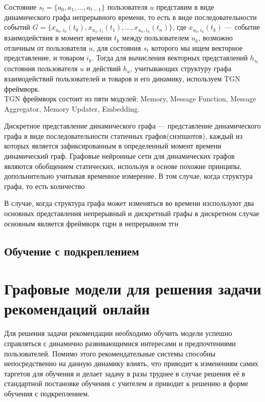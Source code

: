 \documentclass{mipt-thesis-ms}
\begin{document}
Состояние $s_t = \{a_0, a_1, \dots, a_{t-1}\}$ пользователя $u$ представим в виде динамического графа непрерывного времени, то есть в виде последовательности событий $G = \{x_{u_0, i_0}(t_0), x_{u_1, i_1}(t_1), \dots, x_{u_n, i_n}(t_n)\}$, где $x_{u_k, i_k}(t_{k})$ --- событие взаимодействия в момент времени $t_k$ между пользователем $u_k$, возможно отличным от пользователя $u$, для состояния $s_t$ которого мы ищем векторное представление, и товаром $i_k$. Тогда для вычисления векторных представлений $h_{s_t}$ состояния пользователя $u$ и действий $h_a$, учитывающих структуру графа взаимодействий пользователей и товаров и его динамику, используем TGN фреймворк.\\

TGN фреймворк состоит из пяти модулей: Memory, Message Function, Message Aggregator, Memory Updater, Embedding.

Дискретное представление динамического графа --- представление динамического графа в виде последовательности статичных графов(снэпшотов), каждый из которых является зафиксированным в определенный момент времени динамический граф.
Графовые нейронные сети для динамических графов являются обобщением статических, используя в основе похожие принципы, допольнительно учитывая временное измерение.
В том случае, когда структура графа, то есть количество 

В случае, когда структура графа может изменяться во времени изспользуют два основных представления
непрерывный и дискретный графы
в дискретном случае основным является фреймворк гцрн
в непрерывном тгн

\section{Обучение с подкреплением}


\chapter{Графовые модели для решения задачи рекомендаций онлайн}
Для решения задачи рекомендации необходимо обучить модели успешно справляться с динамично развивающимися интересами и предпочтениями пользователей. Помимо этого рекомендательные системы способны непосредственно на данную динамику влиять, что приводит к изменениям самих таргетов для обучения и делает задачу в разы труднее в случае решения её в стандартной постановке обучения с учителем и приводит к решению в форме обучения с подкреплением.\\
\end{document}
